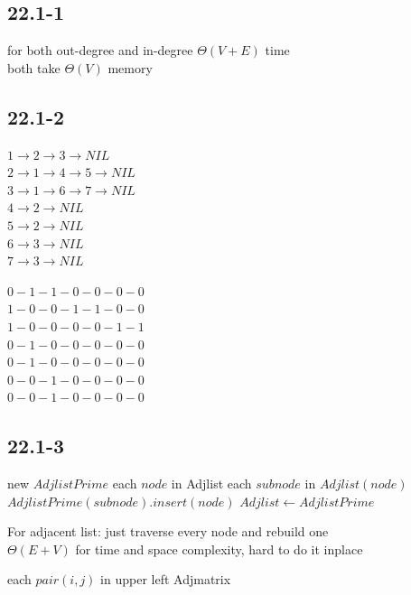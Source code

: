 \documentclass[]{article}
\begin{document}
\subsection{22.1-1}
for both out-degree and in-degree $\Theta (V+E)$ time\\
both take $\Theta (V)$ memory

\subsection{22.1-2}

$1 \rightarrow 2 \rightarrow 3 \rightarrow NIL$\\
$2 \rightarrow 1 \rightarrow 4 \rightarrow 5 \rightarrow NIL$\\
$3 \rightarrow 1 \rightarrow 6 \rightarrow 7 \rightarrow NIL$\\
$4 \rightarrow 2 \rightarrow NIL$\\
$5 \rightarrow 2 \rightarrow NIL$\\
$6 \rightarrow 3 \rightarrow NIL$\\
$7 \rightarrow 3 \rightarrow NIL$

$0-1-1-0-0-0-0$\\
$1-0-0-1-1-0-0$\\
$1-0-0-0-0-1-1$\\
$0-1-0-0-0-0-0$\\
$0-1-0-0-0-0-0$\\
$0-0-1-0-0-0-0$\\
$0-0-1-0-0-0-0$

\subsection{22.1-3}

\begin{codebox}
	\li new $AdjlistPrime$
	\li \For each $node$ in Adjlist
	\li		\Do \For each $subnode$ in $Adjlist(node)$
	\li 		\Do $AdjlistPrime(subnode).insert(node)$
	\li $Adjlist \gets AdjlistPrime$
	\End
\end{codebox}

For adjacent list: just traverse every node and rebuild one\\
$\Theta (E+V)$ for time and space complexity, hard to do it inplace\\

\begin{codebox}
	\li \For each $pair(i,j)$ in upper left Adjmatrix
	\li		\Do {}
	\End
\end{codebox}
\end{document}

